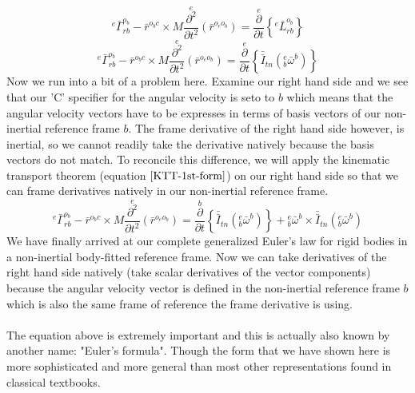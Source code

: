$${}^{e}\bar{\Gamma}^{o_{b}}_{rb} - \bar{r}^{o_{b}c}\times M\overset{e}{\frac{\partial^{2}}{\partial t^{2}}}(\bar{r}^{o_{e}o_{b}}) = \overset{e}{\frac{\partial}{\partial t}}\left\{{}^{e}\bar{L}^{o_{b}}_{rb}\right\}$$
$${}^{e}\bar{\Gamma}^{o_{b}}_{rb} - \bar{r}^{o_{b}c}\times M\overset{e}{\frac{\partial^{2}}{\partial t^{2}}}(\bar{r}^{o_{e}o_{b}}) = \overset{e}{\frac{\partial}{\partial t}}\left\{\bar{\bar{I}}_{tn} ({}^{e}_{b}\bar{\omega}^{b})\right\}$$
Now we run into a bit of a problem here.
Examine our right hand side and we see that our 'C' specifier for the angular velocity is seto to $b$ which means that the angular velocity vectors have to be expresses in terms of basis vectors of our non-inertial reference frame $b$.
The frame derivative of the right hand side however, is inertial, so we cannot readily take the derivative natively because the basis vectors do not match.
To reconcile this difference, we will apply the kinematic transport theorem (equation $\ref{KTT-1st-form}$) on our right hand side so that we can frame derivatives natively in our non-inertial reference frame.
\begin{equation}
{}^{e}\bar{\Gamma}^{o_{b}}_{rb} - \bar{r}^{o_{b}c}\times M\overset{e}{\frac{\partial^{2}}{\partial t^{2}}}(\bar{r}^{o_{e}o_{b}}) = 
\overset{b}{\frac{\partial}{\partial t}}\left\{\bar{\bar{I}}_{tn} ({}^{e}_{b}\bar{\omega}^{b})\right\} + {}^{e}_{b}\bar{\omega}^{b}\times\bar{\bar{I}}_{tn} ({}^{e}_{b}\bar{\omega}^{b})
\label{Euler's Law Rigid Body Non-Inertial Reference Frame Body Fitted Coordiantes}
\end{equation}
We have finally arrived at our complete generalized Euler's law for rigid bodies in a non-inertial body-fitted reference frame.
Now we can take derivatives of the right hand side natively (take scalar derivatives of the vector components) because the angular velocity vector is defined in the non-inertial reference frame $b$ which is also the same frame of reference the frame derivative is using.
\\~\\The equation above is extremely important and this is actually also known by another name: "Euler's formula".
Though the form that we have shown here is more sophisticated and more general than most other representations found in classical textbooks.













